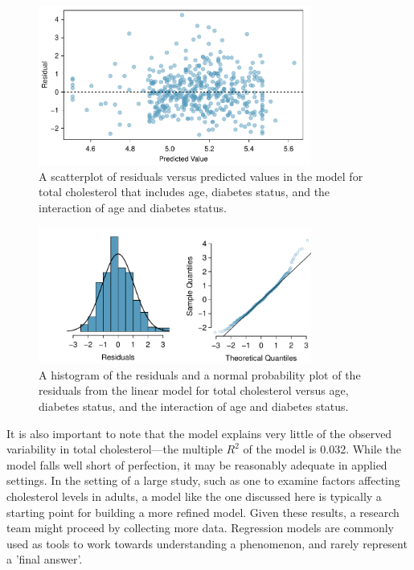 \begin{figure}[h]
	\centering
	\includegraphics[width=0.8\textwidth]
	{ch_multiple_linear_regression_oi_biostat/figures/nhanesAgeDiabetesCholResidPlot/nhanesAgeDiabetesCholResidPlot.pdf}
	\caption{A scatterplot of residuals versus predicted values in the model for total cholesterol that includes age, diabetes status, and the interaction of age and diabetes status.}
	\label{nhanesAgeDiabetesCholResidPlot}
\end{figure}

\begin{figure}[h]
	\centering
	\includegraphics[width=0.8\textwidth]
	{ch_multiple_linear_regression_oi_biostat/figures/nhanesAgeDiabetesCholResidNormPlot/nhanesAgeDiabetesCholResidNormPlot.pdf}
    \caption{A histogram of the residuals and a normal probability plot of the residuals from the linear model for total cholesterol versus age, diabetes status, and the interaction of age and diabetes status.}
   	\label{nhanesAgeDiabetesCholResidNormPlot}
\end{figure}

\textD{\newpage}

It is also important to note that the model explains very little of the observed variability in total cholesterol---the multiple $R^2$ of the model is 0.032. While the model falls well short of perfection, it may be reasonably adequate in applied settings. In the setting of a large study, such as one to examine factors affecting cholesterol levels in adults, a model like the one discussed here is typically a starting point for building a more refined model. Given these results, a research team might proceed by collecting more data. Regression models are commonly used as tools to work towards understanding a phenomenon, and rarely represent a 'final answer'.


